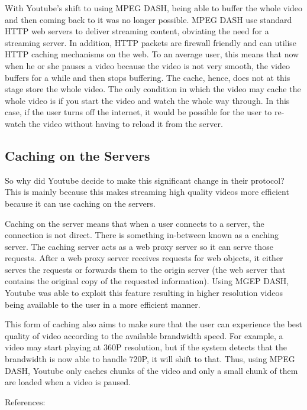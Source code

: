 With Youtube's shift to using MPEG DASH, being able to buffer the whole video and then coming back to it was no longer possible. MPEG DASH use standard HTTP web servers to deliver streaming content, obviating the need for a streaming server. In addition, HTTP packets are firewall friendly and can utilise HTTP caching mechanisms on the web. To an average user, this means that now when he or she pauses a video because the video is not very smooth, the video buffers for a while and then stops buffering. The cache, hence, does not at this stage store the whole video. The only condition in which the video may cache the whole video is if you start the video and watch the whole way through. In this case, if the user turns off the internet, it would be possible for the user to re-watch the video without having to reload it from the server. 

\subsection{Caching on the Servers}
So why did Youtube decide to make this significant change in their protocol? This is mainly because this makes streaming high quality videos more efficient because it can use caching on the servers. 

Caching on the server means that when a user connects to a server, the connection is not direct. There is something in-between known as a caching server. The caching server acts as a web proxy server so it can serve those requests. After a web proxy server receives requests for web objects, it either serves the requests or forwards them to the origin server (the web server that contains the original copy of the requested information). Using MGEP DASH, Youtube was able to exploit this feature resulting in higher resolution videos being available to the user in a more efficient manner. 

This form of caching also aims to make sure that the user can experience the best quality of video according to the available brandwidth speed. For example, a video may start playing at 360P resolution, but if the system detects that the brandwidth is now able to handle 720P, it will shift to that. Thus, using MPEG DASH, Youtube only caches chunks of the video and only a small chunk of them are loaded when a video is paused.



References:

